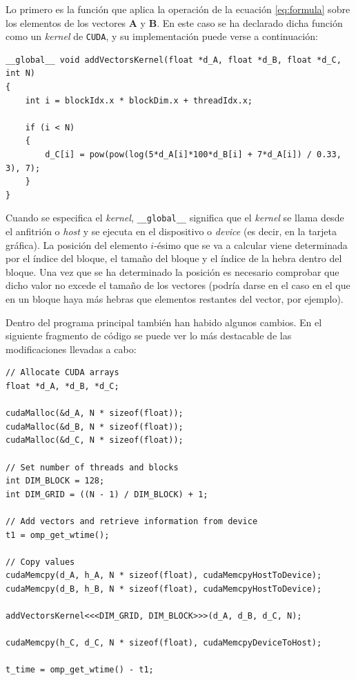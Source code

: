 \documentclass[11pt,a4paper]{article}
\renewcommand{\vec}[1]{\mathbf{#1}}
\begin{document}
Lo primero es la función que aplica la operación de la ecuación \eqref{eq:formula}
sobre los elementos de los vectores $\vec{A}$ y $\vec{B}$. En este caso se
ha declarado dicha función como un \textit{kernel} de \texttt{CUDA}, y su implementación
puede verse a continuación:

\begin{lstlisting}
__global__ void addVectorsKernel(float *d_A, float *d_B, float *d_C, int N)
{
    int i = blockIdx.x * blockDim.x + threadIdx.x;

    if (i < N)
    {
        d_C[i] = pow(pow(log(5*d_A[i]*100*d_B[i] + 7*d_A[i]) / 0.33, 3), 7);
    }
}
\end{lstlisting}

Cuando se especifica el \textit{kernel}, \texttt{\_\_global\_\_} significa que
el \textit{kernel} se llama desde el anfitrión o \textit{host} y se ejecuta
en el dispositivo o \textit{device} (es decir, en la tarjeta gráfica). La posición del
elemento $i$-ésimo que se va a calcular viene determinada por el índice del bloque,
el tamaño del bloque y el índice de la hebra dentro del bloque. Una vez que se
ha determinado la posición es necesario comprobar que dicho valor no excede el
tamaño de los vectores (podría darse en el caso en el que en un bloque haya más
hebras que elementos restantes del vector, por ejemplo).

Dentro del programa principal también han habido algunos cambios. En el siguiente fragmento
de código se puede ver lo más destacable de las modificaciones llevadas a cabo:

\begin{lstlisting}
// Allocate CUDA arrays
float *d_A, *d_B, *d_C;

cudaMalloc(&d_A, N * sizeof(float));
cudaMalloc(&d_B, N * sizeof(float));
cudaMalloc(&d_C, N * sizeof(float));

// Set number of threads and blocks
int DIM_BLOCK = 128;
int DIM_GRID = ((N - 1) / DIM_BLOCK) + 1;
    
// Add vectors and retrieve information from device
t1 = omp_get_wtime();
    
// Copy values
cudaMemcpy(d_A, h_A, N * sizeof(float), cudaMemcpyHostToDevice);
cudaMemcpy(d_B, h_B, N * sizeof(float), cudaMemcpyHostToDevice);

addVectorsKernel<<<DIM_GRID, DIM_BLOCK>>>(d_A, d_B, d_C, N);

cudaMemcpy(h_C, d_C, N * sizeof(float), cudaMemcpyDeviceToHost);

t_time = omp_get_wtime() - t1;
\end{lstlisting}
\end{document}
